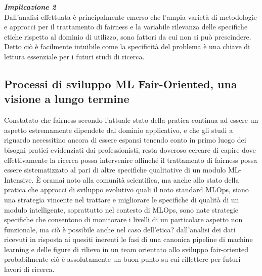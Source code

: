       \begin{center}
	
        \begin{tcolorbox}[width=\textwidth, colframe=black, colback=perla]
    			\begin{minipage}{\textwidth}
    				\textit{\faCaretSquareORight  \textbf{ Implicazione 2}}\\
    		     Dall'analisi effettuata è principalmente emerso che l'ampia varietà di metodologie e approcci per il trattamento di fairness e la variabile rilevanza delle specifiche etiche rispetto al dominio di utilizzo, sono fattori da cui non si può prescindere. Detto ciò è facilmente intuibile come la specificità del problema è una chiave di lettura essenziale per i futuri studi di ricerca.
    			\end{minipage}
		\end{tcolorbox}
	\end{center}
    
    \subsection{Processi di sviluppo ML Fair-Oriented, una visione a lungo termine}
    
    Constatato che fairness secondo l'attuale stato della pratica continua ad essere un aspetto estremamente dipendete dal dominio applicativo, e che gli studi a riguardo necessitino ancora di essere espansi tenendo conto in primo luogo dei bisogni pratici evidenziati dai professionisti, resta doveroso cercare di capire dove effettivamente la ricerca possa intervenire affinché il trattamento di fairness possa essere sistematizzato al pari di altre specifiche qualitative di un modulo ML-Intensive. È oramai noto alla comunità scientifica, ma anche allo stato della pratica che approcci di sviluppo evolutivo quali il noto standard MLOps, siano una strategia vincente nel trattare e migliorare le specifiche di qualità di un modulo intelligente, soprattutto nel contesto di MLOps, sono nate strategie specifiche che consentono di monitorare i livelli di un particolare aspetto non funzionale, ma ciò è possibile anche nel caso dell'etica? dall'analisi dei dati ricevuti in risposta ai quesiti inerenti le fasi di una canonica pipeline di machine learning e delle figure di rilievo in un team orientato allo sviluppo fair-oriented probabilmente ciò è assolutamente un buon punto su cui riflettere per futuri lavori di ricerca. \\
    
